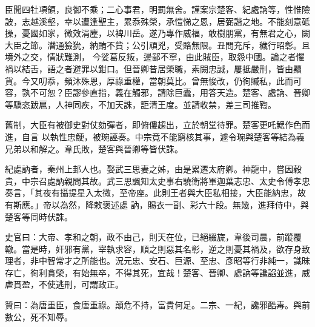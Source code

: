 \begin{pinyinscope}
 臣聞四牡項領，良御不乘；二心事君，明罰無舍。謹案宗楚客、紀處訥等，性惟險詖，志越溪壑，幸以遭逢聖主，累忝殊榮，承愷悌之恩，居弼諧之地。不能刻意砥操，憂國如家，微效涓塵，以裨川岳。遂乃專作威福，敢樹朋黨，有無君之心，闕大臣之節。潛通獫狁，納賄不貲；公引頑兇，受賂無限。丑問充斥，穢行昭彰。且境外之交，情狀難測，
 今娑葛反叛，邊鄙不寧，由此賊臣，取怨中國。論之者懼禍以結舌，語之者避罪以鉗口。但晉卿昔居榮職，素闕忠誠，屢抵嚴刑，皆由黷貨。今又叨忝，頻沐殊恩，厚祿重權，當朝莫比。曾無悛改，仍徇贓私，此而可容，孰不可恕？臣謬參直指，義在觸邪，請除巨蠹，用答天造。楚客、處訥、晉卿等驕恣跋扈，人神同疾，不加天誅，詎清王度。並請收禁，差三司推鞫。



 舊制，大臣有被御史對仗劾彈者，即俯僂趨出，立於朝堂待罪。楚客更吒鰓作色而進，自言
 以執性忠鯁，被琬誣奏。中宗竟不能窮核其事，遽令琬與楚客等結為義兄弟以和解之。韋氏敗，楚客與晉卿等皆伏誅。



 紀處訥者，秦州上邽人也。娶武三思妻之姊，由是累遷太府卿。神龍中，嘗因穀貴，中宗召處訥親問其故。武三思諷知太史事右驍衛將軍迦葉志忠、太史令傅孝忠奏言，「其夜有攝提星入太微，至帝座。此則王者與大臣私相接，大臣能納忠，故有斯應。」帝以為然，降敕褒述處
 訥，賜衣一副、彩六十段。無幾，進拜侍中，與楚客等同時伏誅。



 史官曰：大帝、孝和之朝，政不由己，則天在位，已絕綴旒，韋後司晨，前蹤覆轍。當是時，奸邪有黨，宰執求容，順之則惡其名彰，逆之則憂其禍及，欲存身致理者，非中智常才之所能也。況元忠、安石、巨源、至忠、彥昭等行非純一，識昧存亡，徇利貪榮，有始無卒，不得其死，宜哉！楚客、晉卿、處訥等讒諂並進，威虐貫盈，不使逃刑，可謂政正。



 贊曰：為唐重臣，食唐重祿。顛危不持，富貴何足。二宗、一紀，讒邪酷毒。與前數公，死不知辱。



\end{pinyinscope}